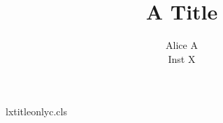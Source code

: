 \begin{filecontents*}[overwrite]{lxtitleonlyc.cls}
\renewcommand\@maketitle{\begin{center}{\Large\@title}\end{center}}
\end{filecontents*}
\documentclass{lxtitleonlyc}

\title{A Title}
\author{Alice A\\Inst X}
\makeatletter\g@addto@macro{}\makeatother
\maketitle
Body text.

